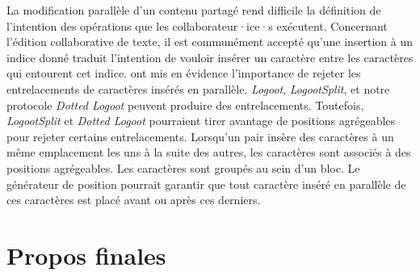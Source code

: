 La modification parallèle d'un contenu partagé rend difficile la définition de l'intention des opérations que les collaborateur·ice·s exécutent.
Concernant l'édition collaborative de texte, il est communément accepté qu'une insertion à un indice donné traduit l'intention de vouloir insérer un caractère entre les caractères qui entourent cet indice.
\textcite{kleppmann2019_interleaving} ont mis en évidence l'importance de rejeter les entrelacements de caractères insérés en parallèle.
\emph{Logoot}, \emph{LogootSplit}, et notre protocole \emph{Dotted Logoot} peuvent produire des entrelacements.
Toutefois, \emph{LogootSplit} et \emph{Dotted Logoot} pourraient tirer avantage de positions agrégeables pour rejeter certains entrelacements.
Lorsqu'un pair insère des caractères à un même emplacement les uns à la suite des autres, les caractères sont associés à des positions agrégeables.
Les caractères sont groupés au sein d'un bloc.
Le générateur de position pourrait garantir que tout caractère inséré en parallèle de ces caractères est placé avant ou après ces derniers.


\section{Propos finales}
